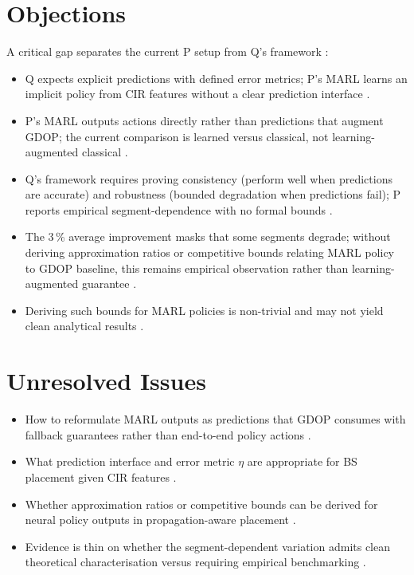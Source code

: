 \documentclass{article}
\begin{document}
\section*{Objections}

A critical gap separates the current P setup from Q's framework :

\begin{itemize}
  \item Q expects explicit predictions with defined error metrics; P's MARL learns an implicit policy from CIR features without a clear prediction interface .
  \item P's MARL outputs actions directly rather than predictions that augment GDOP; the current comparison is learned versus classical, not learning-augmented classical .
  \item Q's framework requires proving consistency (perform well when predictions are accurate) and robustness (bounded degradation when predictions fail); P reports empirical segment-dependence with no formal bounds .
  \item The 3\,\% average improvement masks that some segments degrade; without deriving approximation ratios or competitive bounds relating MARL policy to GDOP baseline, this remains empirical observation rather than learning-augmented guarantee .
  \item Deriving such bounds for MARL policies is non-trivial and may not yield clean analytical results .
\end{itemize}

\section*{Unresolved Issues}

\begin{itemize}
  \item How to reformulate MARL outputs as predictions that GDOP consumes with fallback guarantees rather than end-to-end policy actions .
  \item What prediction interface and error metric \(\eta\) are appropriate for BS placement given CIR features .
  \item Whether approximation ratios or competitive bounds can be derived for neural policy outputs in propagation-aware placement .
  \item Evidence is thin on whether the segment-dependent variation admits clean theoretical characterisation versus requiring empirical benchmarking .
\end{itemize}
\end{document}
